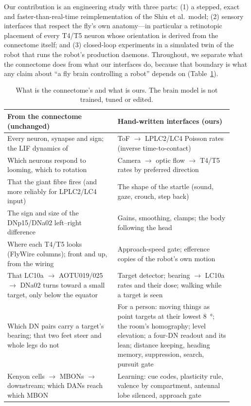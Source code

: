 \documentclass[10pt,a4paper]{article}
\begin{document}
Our contribution is an engineering study with three parts: (1) a stepped, exact and faster-than-real-time
reimplementation of the Shiu et al.\ model; (2) sensory interfaces that respect the fly's own anatomy---in
particular a retinotopic placement of every T4/T5 neuron whose orientation is derived from the connectome
itself; and (3) closed-loop experiments in a simulated twin of the robot that runs the robot's production
daemons. Throughout, we separate what the connectome does from what our interfaces do, because that
boundary is what any claim about ``a fly brain controlling a robot'' depends on (Table~\ref{tab:boundary}).

\begin{table}[t]
\centering\small
\caption{What is the connectome's and what is ours. The brain model is not trained, tuned or edited.}
\label{tab:boundary}
\begin{tabular}{p{0.45\linewidth}p{0.47\linewidth}}
\toprule
From the connectome (unchanged) & Hand-written interfaces (ours) \\
\midrule
Every neuron, synapse and sign; the LIF dynamics of \cite{shiu2024} & ToF $\rightarrow$ LPLC2/LC4 Poisson rates (inverse time-to-contact) \\
Which neurons respond to looming, which to rotation & Camera $\rightarrow$ optic flow $\rightarrow$ T4/T5 rates by preferred direction \\
That the giant fibre fires (and more reliably for LPLC2/LC4 input) & The shape of the startle (sound, gaze, crouch, step back) \\
The sign and size of the DNp15/DNa02 left--right difference & Gains, smoothing, clamps; the body following the head \\
Where each T4/T5 looks (FlyWire columns); front and up, from the wiring & Approach-speed gate; efference copies of the robot's own motion \\
That LC10a $\rightarrow$ AOTU019/025 $\rightarrow$ DNa02 turns toward a small target, only below the equator & Target detector; bearing $\rightarrow$ LC10a rates and their dose; walking while a target is seen \\
Which DN pairs carry a target's bearing; that two feet steer and whole legs do not & For a person: moving things as point targets at their lowest \SI{8}{\degree}; the room's homography; level elevation; a four-DN readout and its lean; distance keeping, heading memory, suppression, search, pursuit gate \\
Kenyon cells $\rightarrow$ MBONs $\rightarrow$ downstream; which DANs reach which MBON & Learning: cue codes, plasticity rule, valence by compartment, antennal lobe silenced, approach gate \\
\bottomrule
\end{tabular}
\end{table}
\end{document}
